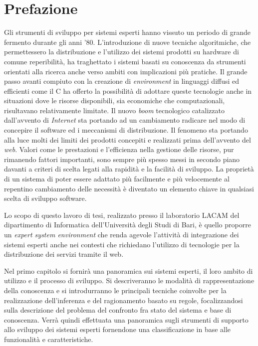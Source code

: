 \chapter*{Prefazione}
\rhead{}

Gli strumenti di sviluppo per sistemi esperti hanno vissuto un periodo di grande fermento durante gli anni '80. L'introduzione di nuove tecniche algoritmiche, che permettessero la distribuzione e l'utilizzo dei sistemi prodotti su hardware di comune reperibilità, ha traghettato i sistemi basati su conoscenza da strumenti orientati alla ricerca anche verso ambiti con implicazioni più pratiche. Il grande passo avanti compiuto con la creazione di \emph{environment} in linguaggi diffusi ed efficienti come il C ha offerto la possibilità di adottare queste tecnologie anche in situazioni dove le risorse disponibili, sia economiche che computazionali, risultavano relativamente limitate. Il nuovo \emph{boom} tecnologico catalizzato dall'avvento di \emph{Internet} sta portando ad un cambiamento radicare nel modo di concepire il software ed i meccanismi di distribuzione. Il fenomeno sta portando alla luce molti dei limiti dei prodotti concepiti e realizzati prima dell'avvento del \emph{web}. Valori come le prestazioni e l'efficienza nella gestione delle risorse, pur rimanendo fattori importanti, sono sempre più spesso messi in secondo piano davanti a criteri di scelta legati alla rapidità e la facilità di sviluppo. La proprietà di un sistema di poter essere adattato più facilmente e più velocemente al repentino cambiamento delle necessità  è diventato un elemento chiave in qualsiasi scelta di sviluppo software.

Lo scopo di questo lavoro di tesi, realizzato presso il laboratorio LACAM del dipartimento di Informatica dell'Università degli Studi di Bari, è quello proporre un \emph{expert system environment} che renda agevole l'attività di integrazione dei sistemi esperti anche nei contesti che richiedano l'utilizzo di tecnologie per la distribuzione dei servizi tramite il web.

Nel primo capitolo si fornirà una panoramica sui sistemi esperti, il loro ambito di utilizzo e il processo di sviluppo. Si descriveranno le modalità di rappresentazione della conoscenza e si introdurranno le principali tecniche coinvolte per la realizzazione dell'inferenza e del ragionamento basato su regole, focalizzandosi sulla descrizione del problema del confronto fra stato del sistema e base di conoscenza. Verrà quindi effettuata una panoramica sugli strumenti di supporto allo sviluppo dei sistemi esperti fornendone una classificazione in base alle funzionalità e caratteristiche.

